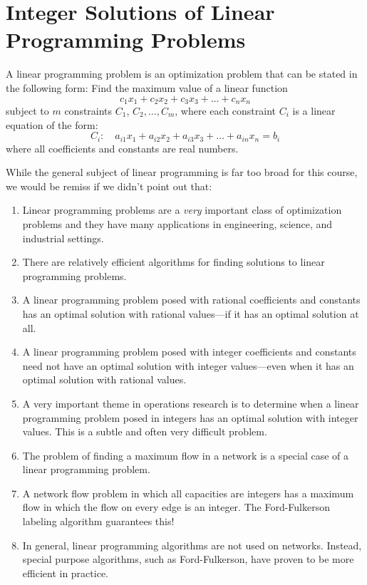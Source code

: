 \section{Integer Solutions of Linear Programming Problems}

A linear programming problem is an optimization problem that
can be stated in the following form:  Find the maximum
value of a linear function
\[
c_1x_1+c_2x_2+c_3x_3+\dots+c_n x_n
\]
subject to $m$ constraints $C_1$, $C_2,\dots,C_m$, where
each constraint $C_i$ is a linear equation of the form:
\[
C_i:\quad a_{i1}x_1+a_{i2}x_2+a_{i3}x_3+\dots+a_{in}x_n=b_i
\]
where all coefficients and constants are real numbers.

While the general subject of linear programming is far too 
broad for this course, we would be remiss if we didn't 
point out that:
\begin{enumerate}
\item Linear programming problems are a \textit{very}
important class of optimization problems and they have
many applications in engineering, science, and industrial settings.
\item There are relatively efficient algorithms for finding
solutions to linear programming problems.
\item  A linear programming problem posed with rational coefficients
and constants has an optimal solution with rational values---if it
has an optimal solution at all.
\item  A linear programming problem posed with integer coefficients
and constants need not have an optimal solution with integer values---even
when it has an optimal solution with rational values.
\item A very important theme in operations research is to determine
when a linear programming problem posed in integers has an optimal
solution with integer values.  This is a subtle and often very difficult
problem.
\item The problem of finding a maximum flow in a network is
a special case of a linear programming problem.
\item A network flow problem in which all capacities are integers
has a maximum flow in which the flow on every edge is an integer.
The Ford-Fulkerson labeling algorithm guarantees this!
\item In general, linear programming algorithms are not used
on networks.  Instead, special purpose algorithms, such as Ford-Fulkerson,
have proven to be more efficient in practice.
\end{enumerate}

